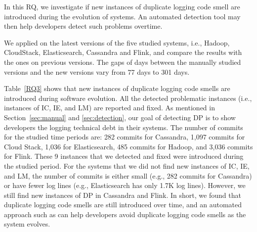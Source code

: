 
In this RQ, we investigate if new instances of duplicate logging code smell are introduced during the evolution of systems. An automated detection tool may then help developers detect such problems overtime.


We applied \toolS on the latest versions of the five studied systems, i.e., Hadoop, CloudStack, Elasticsearch, Cassandra and Flink, and compare the results with the ones on previous versions. The gaps of days between the manually studied versions and the new versions vary from 77 days to 301 days.


Table~\ref{RQ3} shows that new instances of duplicate logging code smells are introduced during software evolution. 
All the detected problematic instances (i.e., instances of IC, IE, and LM) are reported and fixed.
As mentioned in Section~\ref{sec:manual} and \ref{sec:detection}, our goal of detecting DP is to show developers the logging technical debt in their systems. The number of commits for the studied time periods are: 282 commits for Cassandra, 1,097 commits for Cloud Stack, 1,036 for Elasticsearch, 485 commits for Hadoop, and 3,036 commits for Flink. These 9 instances that we detected and fixed were introduced during the studied period. For the systems that we did not find new instances of IC, IE, and LM, the number of commits is either small (e.g., 282 commits for Cassandra) or have fewer log lines (e.g., Elasticsearch has only 1.7K log lines). However, we still find new instances of DP in Cassandra and Flink. In short, we found that duplicate logging code smells are still introduced over time, and an automated approach such as \toolS can help developers avoid duplicate logging code smells as the system evolves.




